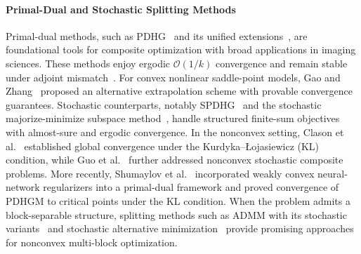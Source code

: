 \paragraph{Primal-Dual and Stochastic Splitting Methods} Primal-dual methods, such as PDHG~\cite{chambolleFirstOrderPrimalDualAlgorithm2011} and its unified extensions~\cite{esserZhangChan2010}, are foundational tools for composite optimization with broad applications in imaging sciences. These methods enjoy ergodic $\mathcal{O}(1/k)$ convergence and remain stable under adjoint mismatch~\cite{chouzenouxAdjointMismatch}. For convex nonlinear saddle-point models, Gao and Zhang~\cite{gao2023alternative} proposed an alternative extrapolation scheme with provable convergence guarantees. Stochastic counterparts, notably SPDHG~\cite{chambolleSPDHG2018} and the stochastic majorize-minimize subspace method~\cite{chouzenouxStochasticMM2017}, handle structured finite-sum objectives with almost-sure and ergodic convergence. In the nonconvex setting, Clason et al.~\cite{clasonAccelerationGlobalConvergence2019} established global convergence under the Kurdyka--{\L}ojasiewicz (KL) condition, while Guo et al.~\cite{guo2023preconditioned} further addressed nonconvex stochastic composite problems. More recently, Shumaylov et al.~\cite{shumaylovweakly} incorporated weakly convex neural-network regularizers into a primal-dual framework and proved convergence of PDHGM to critical points under the KL condition. When the problem admits a block-separable structure, splitting methods such as ADMM with its stochastic variants~\cite{wangGlobalConvergenceADMM2018,ADMMNolinear2024,chen2025convergence,bian2021stochastic} and stochastic alternative minimization~\cite{driggs2021stochastic,InertialProximalAlternating,bian2026stochastic} provide promising approaches for nonconvex multi-block optimization.

